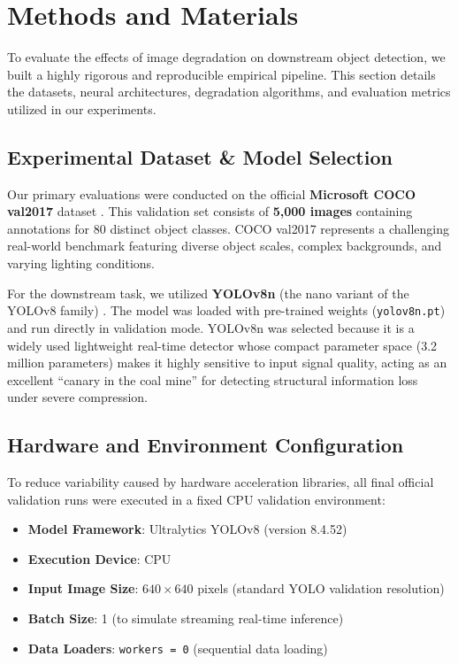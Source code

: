 \documentclass[12pt, a4paper]{article}
\begin{document}
\section{Methods and Materials}
To evaluate the effects of image degradation on downstream object detection, we built a highly rigorous and reproducible empirical pipeline. This section details the datasets, neural architectures, degradation algorithms, and evaluation metrics utilized in our experiments.

\subsection{Experimental Dataset \& Model Selection}
Our primary evaluations were conducted on the official \textbf{Microsoft COCO val2017} dataset \cite{lin2014}. This validation set consists of \textbf{5,000 images} containing annotations for 80 distinct object classes. COCO val2017 represents a challenging real-world benchmark featuring diverse object scales, complex backgrounds, and varying lighting conditions.

For the downstream task, we utilized \textbf{YOLOv8n} (the nano variant of the YOLOv8 family) \cite{jocher2023}. The model was loaded with pre-trained weights (\texttt{yolov8n.pt}) and run directly in validation mode. YOLOv8n was selected because it is a widely used lightweight real-time detector whose compact parameter space (3.2 million parameters) makes it highly sensitive to input signal quality, acting as an excellent ``canary in the coal mine'' for detecting structural information loss under severe compression.

\subsection{Hardware and Environment Configuration}
To reduce variability caused by hardware acceleration libraries, all final official validation runs were executed in a fixed CPU validation environment:
\begin{itemize}
    \item \textbf{Model Framework}: Ultralytics YOLOv8 (version 8.4.52)
    \item \textbf{Execution Device}: CPU
    \item \textbf{Input Image Size}: $640\times640$ pixels (standard YOLO validation resolution)
    \item \textbf{Batch Size}: 1 (to simulate streaming real-time inference)
    \item \textbf{Data Loaders}: \texttt{workers = 0} (sequential data loading)
\end{itemize}
\end{document}
